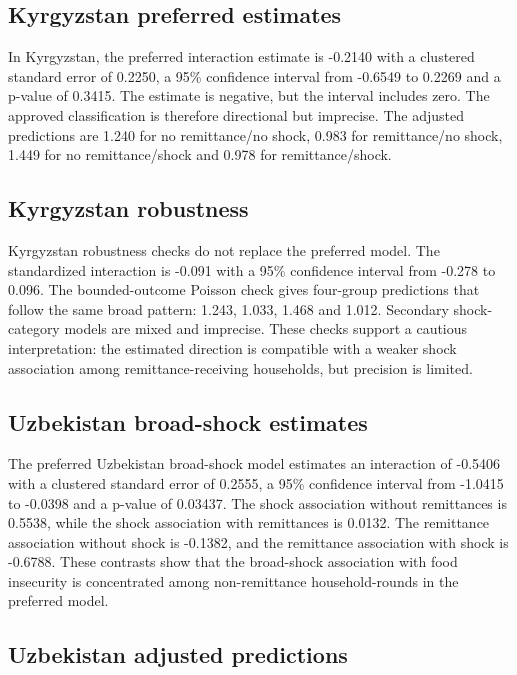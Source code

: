 \documentclass[11pt]{article}
\begin{document}
\subsection{Kyrgyzstan preferred estimates}

In Kyrgyzstan, the preferred interaction estimate is -0.2140 with a clustered standard error of 0.2250, a 95\% confidence interval from -0.6549 to 0.2269 and a p-value of 0.3415. The estimate is negative, but the interval includes zero. The approved classification is therefore directional but imprecise. The adjusted predictions are 1.240 for no remittance/no shock, 0.983 for remittance/no shock, 1.449 for no remittance/shock and 0.978 for remittance/shock.

\subsection{Kyrgyzstan robustness}

Kyrgyzstan robustness checks do not replace the preferred model. The standardized interaction is -0.091 with a 95\% confidence interval from -0.278 to 0.096. The bounded-outcome Poisson check gives four-group predictions that follow the same broad pattern: 1.243, 1.033, 1.468 and 1.012. Secondary shock-category models are mixed and imprecise. These checks support a cautious interpretation: the estimated direction is compatible with a weaker shock association among remittance-receiving households, but precision is limited.

\subsection{Uzbekistan broad-shock estimates}

The preferred Uzbekistan broad-shock model estimates an interaction of -0.5406 with a clustered standard error of 0.2555, a 95\% confidence interval from -1.0415 to -0.0398 and a p-value of 0.03437. The shock association without remittances is 0.5538, while the shock association with remittances is 0.0132. The remittance association without shock is -0.1382, and the remittance association with shock is -0.6788. These contrasts show that the broad-shock association with food insecurity is concentrated among non-remittance household-rounds in the preferred model.

\subsection{Uzbekistan adjusted predictions}
\end{document}
